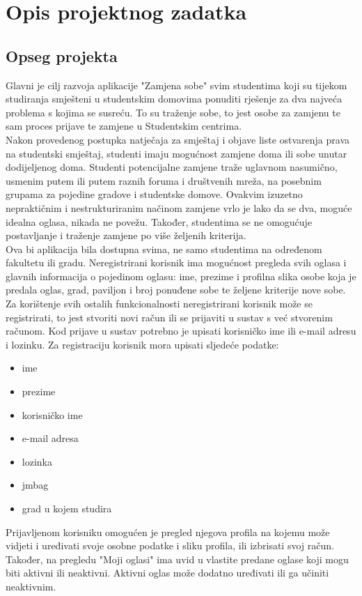 \chapter{Opis projektnog zadatka}
		
		\section{Opseg projekta}
		
		Glavni je cilj razvoja aplikacije "Zamjena sobe" svim studentima koji su tijekom studiranja smješteni u studentskim domovima ponuditi rješenje za dva najveća problema s kojima se susreću. To su traženje sobe, to jest osobe za zamjenu te sam proces prijave te zamjene u Studentskim centrima.\\
		Nakon provedenog postupka natječaja za smještaj i objave liste ostvarenja prava na studentski smještaj, studenti imaju mogućnost zamjene doma ili sobe unutar dodijeljenog doma. 
		Studenti potencijalne zamjene traže uglavnom nasumično, usmenim putem ili putem raznih foruma i društvenih mreža, na posebnim grupama za pojedine gradove i studentske domove. Ovakvim izuzetno nepraktičnim i nestrukturiranim načinom zamjene vrlo je lako da se dva, moguće idealna oglasa, nikada ne povežu. Također, studentima se ne omogućuje postavljanje i traženje zamjene po više željenih kriterija.\\ 
		Ova bi aplikacija bila dostupna svima, ne samo studentima na određenom fakultetu ili gradu. Neregistrirani korisnik ima mogućnost pregleda svih oglasa i glavnih informacija o pojedinom oglasu: ime, prezime i profilna slika osobe koja je predala oglas, grad, paviljon i broj ponuđene sobe te željene kriterije nove sobe. Za korištenje svih ostalih funkcionalnosti neregistrirani korisnik može se registrirati, to jest stvoriti novi račun ili se prijaviti u sustav s već stvorenim računom. Kod prijave u sustav potrebno je upisati korisničko ime ili e-mail adresu i lozinku. Za registraciju korisnik mora upisati sljedeće podatke: 
		\begin{itemize}
			\item ime
			\item prezime
			\item korisničko ime
			\item e-mail adresa
			\item lozinka
			\item jmbag
			\item grad u kojem studira
		\end{itemize} 
		Prijavljenom korisniku omogućen je pregled njegova profila na kojemu može vidjeti i uređivati svoje osobne podatke i sliku profila, ili izbrisati svoj račun. Također, na pregledu "Moji oglasi" ima uvid u vlastite predane oglase koji mogu biti aktivni ili neaktivni. Aktivni oglas može dodatno uređivati ili ga učiniti neaktivnim.\\

